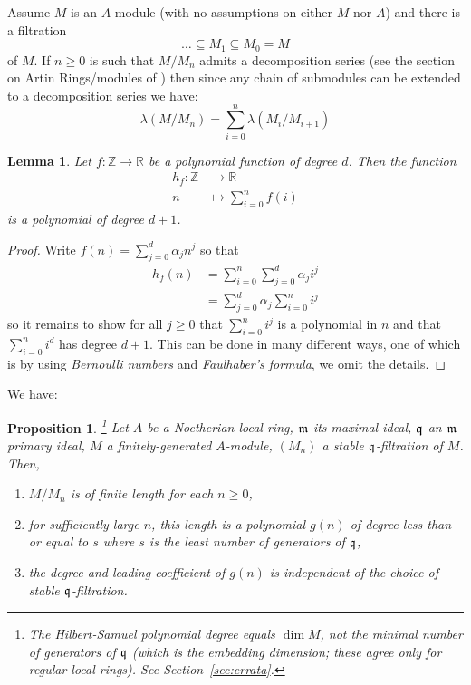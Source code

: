 \documentclass[12pt]{article}
\theoremstyle{plain}
\newtheorem{proposition}[thm]{Proposition}
\newtheorem{lemma}[thm]{Lemma}
\theoremstyle{definition}
\newcommand{\bb}[1]{\mathbb{#1}}
\newcommand{\lto}{\longrightarrow}
\begin{document}
Assume $M$ is an $A$-module (with no assumptions on either $M$ nor $A$) and there is a filtration
\[\hdots \subseteq M_1 \subseteq M_0 = M\] of $M$. If $n \geq 0$ is such that $M/M_n$ admits a decomposition series (see the section on Artin Rings/modules of \cite{com_alg_notes}) then since any chain of submodules can be extended to a decomposition series we have:
\begin{equation}
\label{eq:sum_lengths}
\lambda(M/M_n) = \sum_{i = 0}^n\lambda (M_i/M_{i+1})
\end{equation}
\begin{lemma}
\label{lem:polynomial_sum}
Let $f: \bb{Z} \lto \bb{R}$ be a polynomial function of degree $d$. Then the function
\begin{align*}
    h_f: \bb{Z} &\lto \bb{R}\\
    n &\mapsto \sum_{i = 0}^nf(i)
\end{align*}
is a polynomial of degree $d+1$.
\end{lemma}
\begin{proof}
Write $f(n) = \sum_{j = 0}^d \alpha_j n^j$ so that
\begin{align*}
    h_f(n) &= \sum_{i = 0}^n \sum_{j = 0}^d \alpha_j i^j\\
    &= \sum_{j = 0}^d \alpha_j\sum_{i = 0}^n i^j
\end{align*}
so it remains to show for all $j \geq 0$ that $\sum_{i = 0}^n i^j$ is a polynomial in $n$ and that $\sum_{i = 0}^ni^d$ has degree $d+1$. This can be done in many different ways, one of which is by using \emph{Bernoulli numbers} and \emph{Faulhaber's formula}, we omit the details.
\end{proof}
We have:
\begin{proposition}
\label{prop:Noeth_primary_fin_gen_filtration}\footnote{The Hilbert-Samuel polynomial degree equals $\dim M$, not the minimal number of generators of $\frak{q}$ (which is the embedding dimension; these agree only for regular local rings). See Section~\ref{sec:errata}.}
Let $A$ be a Noetherian local ring, $\frak{m}$ its maximal ideal, $\frak{q}$ an $\frak{m}$-primary ideal, $M$ a finitely-generated $A$-module, $(M_n)$ a stable $\frak{q}$-filtration of $M$. Then,
\begin{enumerate}
\item\label{prop:finite_length} $M/M_n$ is of finite length for each $n \geq 0$,
\item\label{prop:polynomial} for sufficiently large $n$, this length is a polynomial $g(n)$ of degree less than or equal to $s$ where $s$ is the least number of generators of $\frak{q}$,
\item\label{prop:leading_coefficient} the degree and leading coefficient of $g(n)$ is independent of the choice of stable $\frak{q}$-filtration.
\end{enumerate}
\end{proposition}
\end{document}
